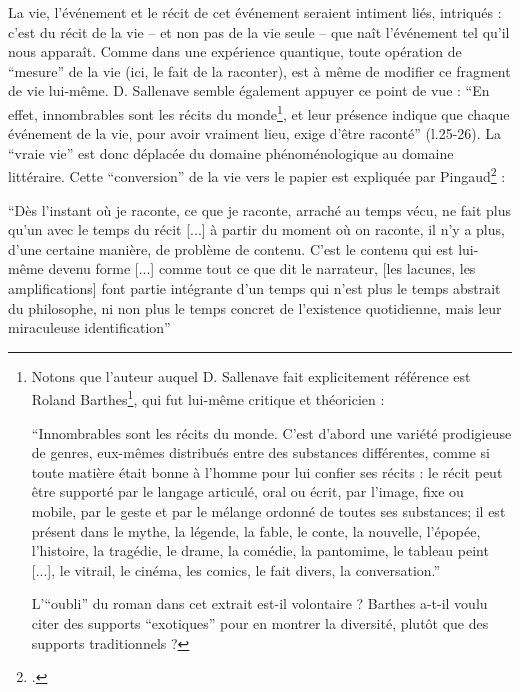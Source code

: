 \documentclass[a4paper,10pt]{article}
\begin{document}
				La vie, l'événement et le récit de cet événement seraient intiment liés, intriqués : c'est du récit de la vie -- et non pas de la vie seule -- que naît l'événement tel qu'il nous apparaît. Comme dans une expérience quantique, toute opération de ``mesure'' de la vie (ici, le fait de la raconter), est à même de modifier ce fragment de vie lui-même. D. Sallenave semble également appuyer ce point de vue : ``En effet, innombrables sont les récits du monde\footnote{Notons que l'auteur auquel D. Sallenave fait explicitement référence est Roland Barthes\footcite{Barthes1966}, qui fut lui-même critique et théoricien :
					\begin{center}
						\footnotesize
						\begin{minipage}{0.7\textwidth}
							``Innombrables sont les récits du monde. C'est d'abord une variété prodigieuse de genres, eux-mêmes distribués entre des substances différentes, comme si toute matière était bonne à l'homme pour lui confier ses récits : le récit peut être supporté par le langage articulé, oral ou écrit, par l'image, fixe ou mobile, par le geste et par le mélange ordonné de toutes ses substances; il est présent dans le mythe, la légende, la fable, le conte, la nouvelle, l'épopée, l'histoire, la tragédie, le drame, la comédie, la pantomime, le tableau peint [...], le vitrail, le cinéma, les comics, le fait divers, la conversation.''
						\end{minipage}
					\end{center} L'``oubli'' du roman dans cet extrait est-il volontaire ? Barthes a-t-il voulu citer des supports ``exotiques'' pour en montrer la diversité, plutôt que des supports traditionnels ?}, et leur présence indique que chaque événement de la vie, pour avoir vraiment lieu, exige d'être raconté'' (l.25-26). La ``vraie vie'' est donc déplacée du domaine phénoménologique au domaine littéraire. Cette ``conversion'' de la vie vers le papier est expliquée par Pingaud\footcite{Pingaud1992} :
				\begin{center}
					\footnotesize
					\begin{minipage}{0.7\textwidth}
						``Dès l'instant où je raconte, ce que je raconte, arraché au temps vécu, ne fait plus qu'un avec le temps du récit [...] à partir du moment où on raconte, il n'y a plus, d'une certaine manière, de problème de contenu. C'est le contenu qui est lui-même devenu forme [...] comme tout ce que dit le narrateur, [les lacunes, les amplifications] font partie intégrante d'un temps qui n'est plus le temps abstrait du philosophe, ni non plus le temps concret de l'existence quotidienne, mais leur miraculeuse identification''
					\end{minipage}
				\end{center}
\end{document}
